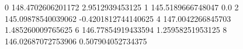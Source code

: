 0 148.4702606201172 2.9512939453125
1 145.5189666748047 0.0
2 145.09878540039062 -0.4201812744140625
4 147.0042266845703 1.485260009765625
6 146.77854919433594 1.25958251953125
8 146.02687072753906 0.507904052734375
